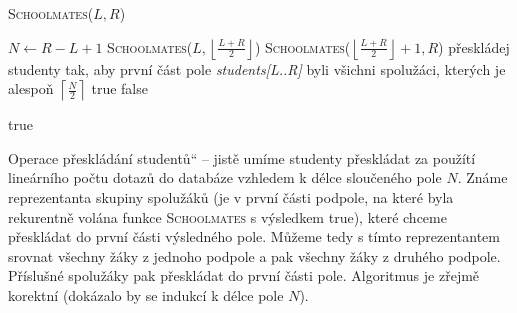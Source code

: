 \documentclass[12pt]{article}
\newcommand{\la}{\leftarrow}
\newcommand{\var}[1]{\textit{#1}}
\newcommand{\uv}[1]{\quotedblbase #1\textquotedblleft}
\begin{document}
\begin{algorithm}
\textsc{Schoolmates}($L,R$)
\begin{algorithmic}[1]
\STATE $N \la R-L+1$
\STATE \textsc{Schoolmates}($L,\left\lfloor\frac{L+R}{2} \right\rfloor$)
\STATE \textsc{Schoolmates}($\left\lfloor\frac{L+R}{2} \right\rfloor+1,R$)
\STATE přeskládej studenty tak, aby první část pole \var{students[L..R]} byli
všichni spolužáci, kterých je alespoň $\left\lceil\frac{N}{2} \right\rceil$
\RETURN true
\ELSE
\RETURN false
\ENDIF


\ELSE
\RETURN true
\ENDIF
\end{algorithmic}
\end{algorithm}
Operace \uv{přeskládání studentů} -- jistě umíme studenty přeskládat za použítí
lineárního počtu dotazů do databáze vzhledem k délce sloučeného pole $N$. Známe
reprezentanta skupiny spolužáků (je v první části podpole, na které byla
rekurentně volána funkce \textsc{Schoolmates} s výsledkem true), které chceme přeskládat do první části
výsledného pole. Můžeme tedy s tímto reprezentantem srovnat všechny žáky z
jednoho podpole a pak všechny žáky z druhého podpole. Příslušné spolužáky pak
přeskládat do první části pole. Algoritmus je zřejmě korektní (dokázalo by se
indukcí k délce pole $N$).
\end{document}

